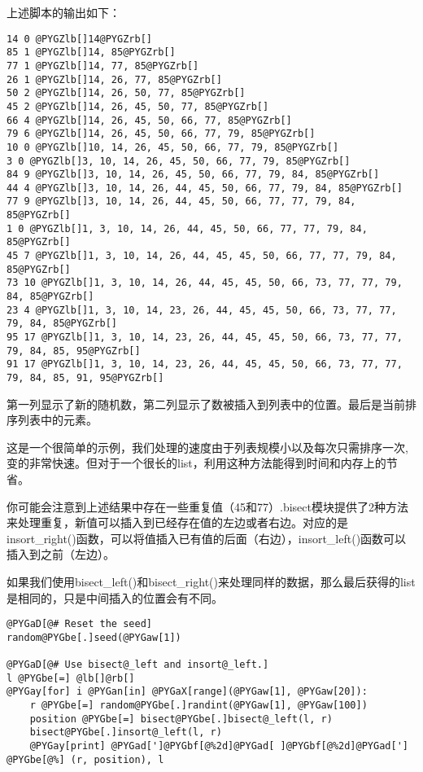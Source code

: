 \documentclass[a4paper,10pt,english]{manual}
\begin{document}
上述脚本的输出如下：

\begin{Verbatim}[commandchars=@\[\]]
14 0 @PYGZlb[]14@PYGZrb[]
85 1 @PYGZlb[]14, 85@PYGZrb[]
77 1 @PYGZlb[]14, 77, 85@PYGZrb[]
26 1 @PYGZlb[]14, 26, 77, 85@PYGZrb[]
50 2 @PYGZlb[]14, 26, 50, 77, 85@PYGZrb[]
45 2 @PYGZlb[]14, 26, 45, 50, 77, 85@PYGZrb[]
66 4 @PYGZlb[]14, 26, 45, 50, 66, 77, 85@PYGZrb[]
79 6 @PYGZlb[]14, 26, 45, 50, 66, 77, 79, 85@PYGZrb[]
10 0 @PYGZlb[]10, 14, 26, 45, 50, 66, 77, 79, 85@PYGZrb[]
3 0 @PYGZlb[]3, 10, 14, 26, 45, 50, 66, 77, 79, 85@PYGZrb[]
84 9 @PYGZlb[]3, 10, 14, 26, 45, 50, 66, 77, 79, 84, 85@PYGZrb[]
44 4 @PYGZlb[]3, 10, 14, 26, 44, 45, 50, 66, 77, 79, 84, 85@PYGZrb[]
77 9 @PYGZlb[]3, 10, 14, 26, 44, 45, 50, 66, 77, 77, 79, 84, 85@PYGZrb[]
1 0 @PYGZlb[]1, 3, 10, 14, 26, 44, 45, 50, 66, 77, 77, 79, 84, 85@PYGZrb[]
45 7 @PYGZlb[]1, 3, 10, 14, 26, 44, 45, 45, 50, 66, 77, 77, 79, 84, 85@PYGZrb[]
73 10 @PYGZlb[]1, 3, 10, 14, 26, 44, 45, 45, 50, 66, 73, 77, 77, 79, 84, 85@PYGZrb[]
23 4 @PYGZlb[]1, 3, 10, 14, 23, 26, 44, 45, 45, 50, 66, 73, 77, 77, 79, 84, 85@PYGZrb[]
95 17 @PYGZlb[]1, 3, 10, 14, 23, 26, 44, 45, 45, 50, 66, 73, 77, 77, 79, 84, 85, 95@PYGZrb[]
91 17 @PYGZlb[]1, 3, 10, 14, 23, 26, 44, 45, 45, 50, 66, 73, 77, 77, 79, 84, 85, 91, 95@PYGZrb[]
\end{Verbatim}

第一列显示了新的随机数，第二列显示了数被插入到列表中的位置。最后是当前排序列表中的元素。

这是一个很简单的示例，我们处理的速度由于列表规模小以及每次只需排序一次, 变的非常快速。但对于一个很长的list，利用这种方法能得到时间和内存上的节省。

你可能会注意到上述结果中存在一些重复值（45和77）.bisect模块提供了2种方法来处理重复，新值可以插入到已经存在值的左边或者右边。对应的是 insort\_right()函数，可以将值插入已有值的后面（右边），insort\_left()函数可以插入到之前（左边）。

如果我们使用bisect\_left()和bisect\_right()来处理同样的数据，那么最后获得的list是相同的，只是中间插入的位置会有不同。

\begin{Verbatim}[commandchars=@\[\]]
@PYGaD[@# Reset the seed]
random@PYGbe[.]seed(@PYGaw[1])

@PYGaD[@# Use bisect@_left and insort@_left.]
l @PYGbe[=] @lb[]@rb[]
@PYGay[for] i @PYGan[in] @PYGaX[range](@PYGaw[1], @PYGaw[20]):
    r @PYGbe[=] random@PYGbe[.]randint(@PYGaw[1], @PYGaw[100])
    position @PYGbe[=] bisect@PYGbe[.]bisect@_left(l, r)
    bisect@PYGbe[.]insort@_left(l, r)
    @PYGay[print] @PYGad[']@PYGbf[@%2d]@PYGad[ ]@PYGbf[@%2d]@PYGad['] @PYGbe[@%] (r, position), l
\end{Verbatim}
\end{document}
